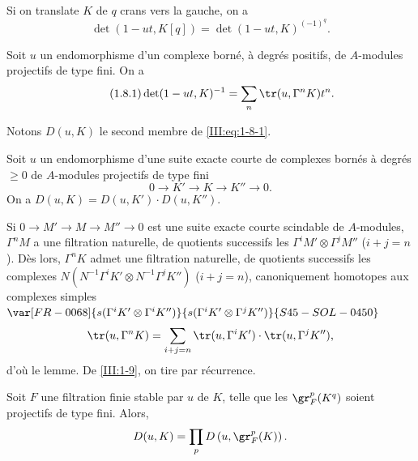 Si on translate $K$ de $q$ crans vers la gauche, on a 
\[
  \det(1-u t,K[q]) = \det(1-u t,K)^{(-1)^q} \text{.}
\]





\begin{proposition_}\label{III:1-8}
Soit $u$ un endomorphisme d'un complexe borné, à degrés positifs, de 
$A$-modules projectifs de type fini. On a \
\begin{equation*}\tag{1.8.1}\label{III:eq:1-8-1}
  \det(1-u t,K)^{-1} = \sum_n \tr(u,\Gamma^n K) t^n \text{.}
\end{equation*}
\end{proposition_}

Notons $D(u,K)$ le second membre de \eqref{III:eq:1-8-1}. 





\begin{lemma_}\label{III:1-9}
Soit $u$ un endomorphisme d'une suite exacte courte de complexes bornés à 
degrés $\geqslant 0$ de $A$-modules projectifs de type fini 
\[
  0 \to K' \to K \to K'' \to 0 \text{.}
\]
On a $D(u,K)=D(u,K')\cdot D(u,K'')$.
\end{lemma_}

Si $0\to M'\to M\to M''\to 0$ est une suite exacte courte scindable de 
$A$-modules, $\Gamma^n M$ a une filtration naturelle, de quotients successifs 
les $\Gamma^i M'\otimes \Gamma^j M''$ ($i+j=n$). Dès lors, $\Gamma^n K$ admet 
une filtration naturelle, de quotients successifs les complexes 
$N(N^{-1} \Gamma^i K'\otimes N^{-1}\Gamma^j K'')$ ($i+j=n$), canoniquement 
homotopes aux complexes simples $\var[FR-0068]{s(\Gamma^i K'\otimes \Gamma^i K'')}{s(\Gamma^i K'\otimes \Gamma^j K'')}{S45-SOL-0450}$   
\[
  \tr(u,\Gamma^n K) = \sum_{i+j=n} \tr(u,\Gamma^i K')\cdot \tr(u,\Gamma^j K'') \text{,}
\]
d'où le lemme. De \ref{III:1-9}, on tire par récurrence. 





\begin{lemma_}\label{III:1-10}
Soit $F$ une filtration finie stable par $u$ de $K$, telle que les 
$\gr_F^p(K^q)$ soient projectifs de type fini. Alors, 
\[
  D(u,K) = \prod_p D\left(u,\gr_F^p(K)\right) \text{.}
\]
\end{lemma_}





